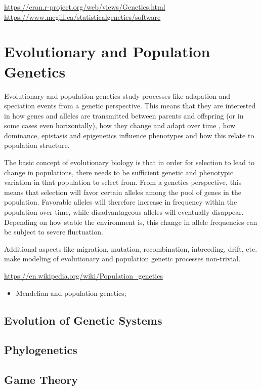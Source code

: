 \documentclass[12pt,]{krantz}
\providecommand{\tightlist}{%
  \setlength{\itemsep}{0pt}\setlength{\parskip}{0pt}}
\theoremstyle{definition}
\theoremstyle{definition}
\theoremstyle{definition}
\theoremstyle{remark}
\begin{document}
\url{https://cran.r-project.org/web/views/Genetics.html}
\url{https://www.mcgill.ca/statisticalgenetics/software}

\chapter{Evolutionary and Population
Genetics}\label{evolutionary-and-population-genetics}

Evolutionary and population genetics study processes like adapation and
speciation events from a genetic perspective. This means that they are
interested in how genes and alleles are transmitted between parents and
offspring (or in some cases even horizontally), how they change and
adapt over time , how dominance, epistasis and epigenetics influence
phenotypes and how this relate to population structure.

The basic concept of evolutionary biology is that in order for selection
to lead to change in populations, there needs to be sufficient genetic
and phenotypic variation in that population to select from. From a
genetics perspective, this means that selection will favor certain
alleles among the pool of genes in the population. Favorable alleles
will therefore increase in frequency within the population over time,
while disadvantageous alleles will eventually disappear. Depending on
how stable the environment is, this change in allele frequencies can be
subject to severe fluctuation.

Additional aspects like migration, mutation, recombination, inbreeding,
drift, etc. make modeling of evolutionary and population genetic
processes non-trivial.

\url{https://en.wikipedia.org/wiki/Population_genetics}

\begin{itemize}
\tightlist
\item
  Mendelian and population genetics;
\end{itemize}

\section{Evolution of Genetic
Systems}\label{evolution-of-genetic-systems}

\section{Phylogenetics}\label{phylogenetics}

\section{Game Theory}\label{game-theory}
\end{document}
